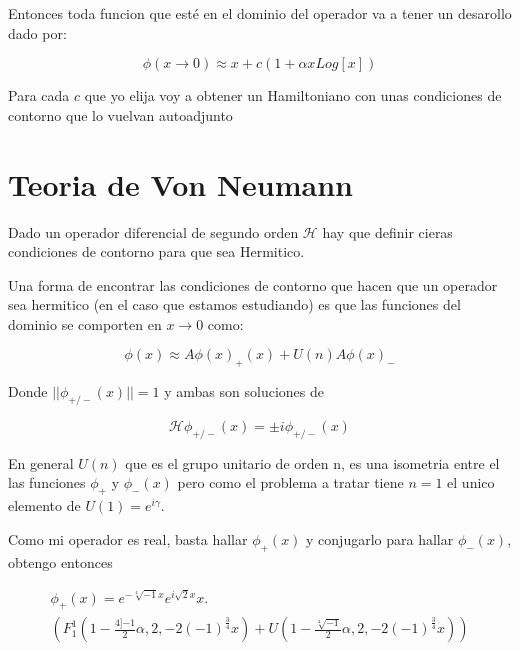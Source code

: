 Entonces toda funcion que esté en el dominio del operador va a tener un desarollo dado por:

\begin{equation}
\phi ( x \rightarrow 0 ) \approx x + c \left(  1 + \alpha x Log[x]   \right)
\end{equation}

Para cada $c$ que yo elija voy a obtener un Hamiltoniano con unas condiciones de contorno que lo vuelvan autoadjunto

\section{Teoria de Von Neumann}


Dado un operador diferencial de segundo orden $\mathscr{H}$ hay que definir cieras condiciones de contorno para que sea Hermitico.

Una forma de encontrar las condiciones de contorno que hacen que un operador sea hermitico (en el caso que estamos estudiando) es que las funciones del dominio se comporten en $x \rightarrow 0$ como:

\begin{equation}
\phi (x) \approx  A \phi (x) _{+} (x) + U(n) A \phi (x) _{-}
\end{equation}
 

Donde $|| \phi _{+/-} (x) || = 1$ y ambas son soluciones de 

\begin{equation}
\mathscr{H} \phi _{+/-} (x) = \pm i \phi _{+/-} (x)
\end{equation}

En general $U(n)$ que es el grupo unitario de orden n, es una isometria entre el las funciones $\phi _{+}$ y $\phi _{-} (x) $ pero como el problema a tratar tiene $n=1$ el unico elemento de $U(1) = e ^{i \gamma}$.


Como mi operador es real, basta hallar $\phi _{+} (x) $ y conjugarlo para hallar $ \phi _{-} (x) $, obtengo entonces 

\begin{equation}
\begin{array}{c}
\phi _{+} (x) = e ^{- \sqrt[4]{-1} x } e ^{i \sqrt{2} x } x . \\
\left(
F _1 ^1 (1 - \frac{ 4]{-1} }{2} \alpha ,2 , -2 (-1) ^{\frac{3}{4} } x )  +
U(1 - \frac{ \sqrt[4]{-1} }{2} \alpha ,2 , -2 (-1) ^{\frac{3}{4} } x )
\right)
\end{array}
\end{equation}

